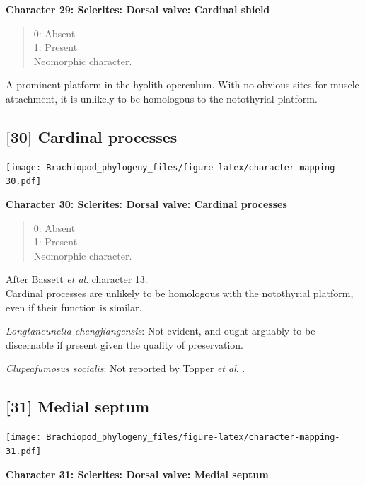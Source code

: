 \documentclass[]{book}
\theoremstyle{definition}
\theoremstyle{definition}
\theoremstyle{definition}
\theoremstyle{remark}
\begin{document}
\textbf{Character 29: Sclerites: Dorsal valve: Cardinal shield}

\begin{quote}
0: Absent\\
1: Present\\
Neomorphic character.
\end{quote}

A prominent platform in the hyolith operculum. With no obvious sites for
muscle attachment, it is unlikely to be homologous to the notothyrial
platform.

\hypertarget{cardinal-processes}{%
\subsection*{{[}30{]} Cardinal processes}\label{cardinal-processes}}

\texttt{[image: Brachiopod\_phylogeny\_files/figure-latex/character-mapping-30.pdf]}

\textbf{Character 30: Sclerites: Dorsal valve: Cardinal processes}

\begin{quote}
0: Absent\\
1: Present\\
Neomorphic character.
\end{quote}

After Bassett \emph{et al}.
\citeyearpar{Bassett2001Functionalmorphology} character 13.\\
Cardinal processes are unlikely to be homologous with the notothyrial
platform, even if their function is similar.

\emph{Longtancunella chengjiangensis}: Not evident, and ought arguably
to be discernable if present given the quality of preservation.

\emph{Clupeafumosus socialis}: Not reported by Topper \emph{et al}.
\citeyearpar{Topper2013Reappraisalof}.

\hypertarget{medial-septum}{%
\subsection*{{[}31{]} Medial septum}\label{medial-septum}}

\texttt{[image: Brachiopod\_phylogeny\_files/figure-latex/character-mapping-31.pdf]}

\textbf{Character 31: Sclerites: Dorsal valve: Medial septum}
\end{document}
